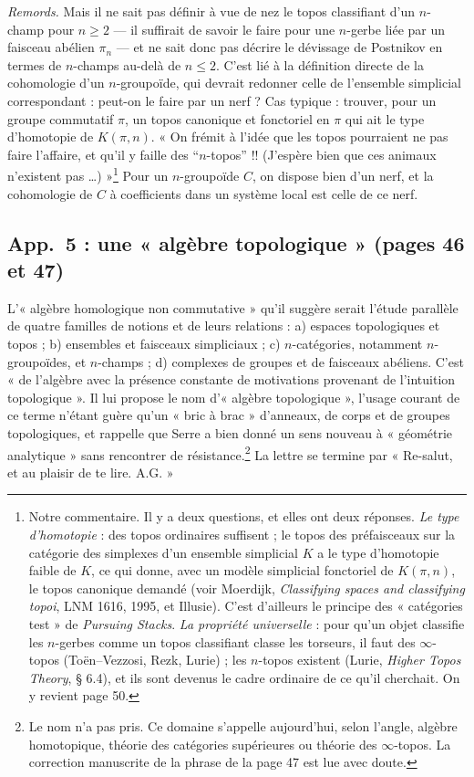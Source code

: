 \documentclass[11pt,a4paper]{article}
\begin{document}
\emph{Remords.} Mais il ne sait pas définir à vue de nez le topos classifiant
d'un $n$-champ pour $n \geqslant 2$ --- il suffirait de savoir le faire pour
une $n$-gerbe liée par un faisceau abélien $\pi_n$ --- et ne sait donc pas
décrire le dévissage de Postnikov en termes de $n$-champs au-delà de
$n \leqslant 2$. C'est lié à la définition directe de la cohomologie d'un
$n$-groupoïde, qui devrait redonner celle de l'ensemble simplicial
correspondant : peut-on le faire par un nerf ? Cas typique : trouver, pour un
groupe commutatif $\pi$, un topos canonique et fonctoriel en $\pi$ qui ait
le type d'homotopie de $K(\pi,n)$. « On frémit à l'idée que les topos
pourraient ne pas faire l'affaire, et qu'il y faille des “$n$-topos” !!
(J'espère bien que ces animaux n'existent pas …) »\footnote{Notre
commentaire. Il y a deux questions, et elles ont deux réponses. \emph{Le
type d'homotopie} : des topos ordinaires suffisent ; le topos des
préfaisceaux sur la catégorie des simplexes d'un ensemble simplicial $K$ a
le type d'homotopie faible de $K$, ce qui donne, avec un modèle simplicial
fonctoriel de $K(\pi,n)$, le topos canonique demandé (voir Moerdijk,
\emph{Classifying spaces and classifying topoi}, LNM 1616, 1995, et
Illusie). C'est d'ailleurs le principe des « catégories test » de
\emph{Pursuing Stacks}. \emph{La propriété universelle} : pour qu'un objet
classifie les $n$-gerbes comme un topos classifiant classe les torseurs, il
faut des $\infty$-topos (Toën--Vezzosi, Rezk, Lurie) ; les $n$-topos
existent (Lurie, \emph{Higher Topos Theory}, § 6.4), et ils sont devenus le
cadre ordinaire de ce qu'il cherchait. On y revient page 50.} Pour un
$n$-groupoïde $C$, on dispose bien d'un nerf, et la cohomologie de $C$ à
coefficients dans un système local est celle de ce nerf.

\subsection*{App.~5 : une « algèbre topologique » (pages 46 et 47)}

L'« algèbre homologique non commutative » qu'il suggère serait l'étude
parallèle de quatre familles de notions et de leurs relations : a) espaces
topologiques et topos ; b) ensembles et faisceaux simpliciaux ; c)
$n$-catégories, notamment $n$-groupoïdes, et $n$-champs ; d) complexes de
groupes et de faisceaux abéliens. C'est « de l'algèbre avec la présence
constante de motivations provenant de l'intuition topologique ». Il lui
propose le nom d'« algèbre topologique », l'usage courant de ce terme
n'étant guère qu'un « bric à brac » d'anneaux, de corps et de groupes
topologiques, et rappelle que Serre a bien donné un sens nouveau à
« géométrie analytique » sans rencontrer de résistance.\footnote{Le nom n'a
pas pris. Ce domaine s'appelle aujourd'hui, selon l'angle, algèbre
homotopique, théorie des catégories supérieures ou théorie des
$\infty$-topos. La correction manuscrite de la phrase de la page 47 est lue
avec doute.} La lettre se termine par « Re-salut, et au plaisir de te
lire. A.G. »
\end{document}
